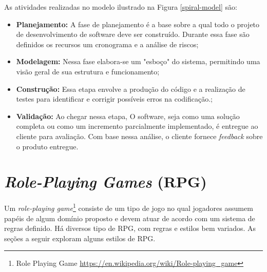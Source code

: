 
As atividades realizadas no modelo ilustrado na Figura \ref{spiral-model} são:
\begin{itemize}
    \item \textbf{Planejamento:} A fase de planejamento é a base sobre a qual todo o projeto de desenvolvimento de software deve ser construído. Durante essa fase são definidos os recursos um cronograma e a análise de riscos;
    \item \textbf{Modelagem:} Nessa fase elabora-se um "esboço" do sistema, permitindo uma visão geral de sua estrutura e funcionamento;
    \item \textbf{Construção:} Essa etapa envolve a produção do código e a realização de testes para identificar e corrigir possíveis erros na codificação.;
    \item \textbf{Validação:} Ao chegar nessa etapa, O software, seja como uma solução completa ou como um incremento parcialmente implementado, é entregue ao cliente para avaliação. Com base nessa análise, o cliente fornece \textit{feedback} sobre o produto entregue.
\end{itemize}


\section{\textit{Role-Playing Games} (RPG)}
\label{sec:rpg}

Um \textit{role-playing game}\footnote{Role Playing Game \url{https://en.wikipedia.org/wiki/Role-playing_game}} consiste de um tipo de jogo no qual jogadores assumem papéis de algum domínio proposto e devem atuar de acordo com um sistema de regras definido. Há diversos tipo de RPG, com regras e estilos bem variados. As seções a seguir exploram alguns estilos de RPG.

